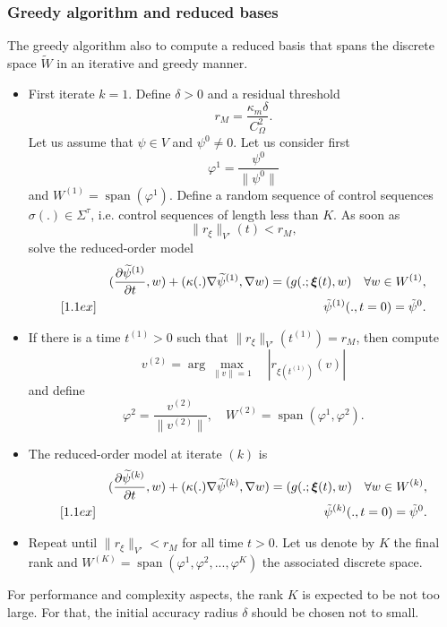\subsubsection{Greedy algorithm and reduced bases}
%
The greedy algorithm also to compute a reduced basis that spans the discrete
space $\tilde W$ in an iterative and greedy manner.
%
\begin{itemize}
\item First iterate $k=1$. Define $\delta >0$ and a residual threshold 
\[
r_M = \frac{\kappa_m \delta}{C_\Omega^2}.
\]
Let us assume that $\psi\in V$ and $\psi^0\neq 0$. Let us consider first
\[
\varphi^1 = \frac{\psi^0}{\|\psi^0\|}
\]
and $W^{(1)}=\mathop{span}(\varphi^1)$. Define a random sequence of control
sequences $\sigma(.)\in \Sigma^\tau$, i.e. control sequences of length less
than $K$. As soon as 
\[
\|r_\xi\|_{V'}(t) < r_M,
\]
solve the reduced-order model
%
\begin{eqnarray}
&& (\frac{\partial \widetilde \psi^{(1)}}{\partial t},w) + (\kappa(.)\nabla \widetilde\psi^{(1)},\nabla w)
= (g(.;\bm{\xi}(t),w) \quad \forall w \in W^{(1)}, \label{eq:} \\ [1.1ex]
&& \tilde \psi^{(1)}(.,t=0) = \tilde \psi^0. \label{eq:}
\end{eqnarray}
%
%
\item If there is a time $t^{(1)}>0$ such that $\|r_\xi\|_{V'}(t^{(1)}) = r_M$, then compute
\[
v^{(2)} = \arg \max_{\|v\|= 1}\quad |r_{\xi(t^{(1)})}(v)| 
\]
and define
\[
\varphi^2 = \frac{v^{(2)}}{\|v^{(2)}\|},\quad W^{(2)}=\mathop{span}(\varphi^1,\varphi^2).
\]
\item The reduced-order model at iterate $(k)$ is
\begin{eqnarray}
&& (\frac{\partial \widetilde \psi^{(k)}}{\partial t},w) + (\kappa(.)\nabla \widetilde\psi^{(k)},\nabla w)
= (g(.;\bm{\xi}(t),w) \quad \forall w \in W^{(k)}, \label{eq:} \\ [1.1ex]
&& \tilde \psi^{(k)}(.,t=0) = \tilde \psi^0. \label{eq:}
\end{eqnarray}

\item Repeat until $\|r_\xi\|_{V'}<r_M$ for all time $t>0$. 
Let us denote by $K$ the final rank and 
$W^{(K)}=\mathop{span}(\varphi^1,\varphi^2,...,\varphi^K)$ the associated discrete space.
\end{itemize}
%
For performance and complexity aspects, the rank $K$ is expected to be not too large.
For that, the initial accuracy radius $\delta$ should be chosen not to small.
%
%
%
%
